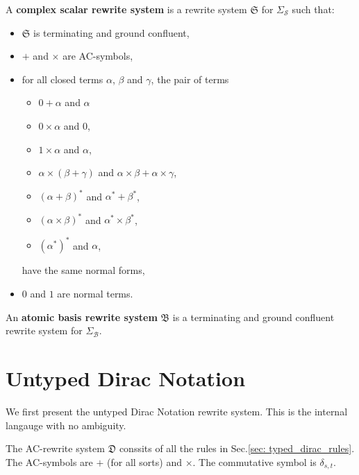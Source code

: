 \begin{definition}
  A \textbf{complex scalar rewrite system} is a rewrite system $\mathfrak{S}$ for $\Sigma_\mathcal{S}$ such that:
  \begin{itemize}
    \item $\mathfrak{S}$ is terminating and ground confluent,
    \item $+$ and $\times$ are AC-symbols,
    \item for all closed terms $\alpha$, $\beta$ and $\gamma$, the pair of terms
      \begin{itemize}
        \item $0 + \alpha$ and $\alpha$
        \item $0 \times \alpha$ and $0$,
        \item $1 \times \alpha$ and $\alpha$,
        \item $\alpha \times (\beta + \gamma)$ and $\alpha \times \beta + \alpha \times \gamma$,
        \item $(\alpha + \beta)^*$ and $\alpha^* + \beta^*$,
        \item $(\alpha \times \beta)^*$ and $\alpha^* \times \beta^*$,
        \item $(\alpha^*)^*$ and $\alpha$,
      \end{itemize}
      have the same normal forms,
    \item $0$ and $1$ are normal terms.
  \end{itemize}
\end{definition}


\begin{definition}
  An \textbf{atomic basis rewrite system} $\mathfrak{B}$ is a terminating and ground confluent rewrite system for $\Sigma_\mathcal{B}$.
\end{definition}


\section{Untyped Dirac Notation}

\begin{definition}
  
\end{definition}


We first present the untyped Dirac Notation rewrite system. This is the internal langauge with no ambiguity.


\begin{definition} 
  The AC-rewrite system $\mathfrak{D}$ conssits of all the rules in Sec.\ref{sec: typed_dirac_rules}.
  The AC-symbols are $+$ (for all sorts) and $\times$. The commutative symbol is $\delta_{s, t}$.
\end{definition}

